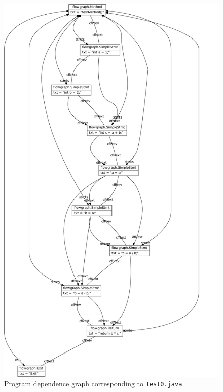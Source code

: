 \documentclass[10pt]{article}
\begin{document}
\begin{figure}[h!]
  \centering
  \includegraphics[height=0.9\textheight]{../results/Test0-DataFlowGraph}
  \caption{Program dependence graph corresponding to \texttt{Test0.java}}
  \label{fig:pdg-test0}
\end{figure}
\end{document}
